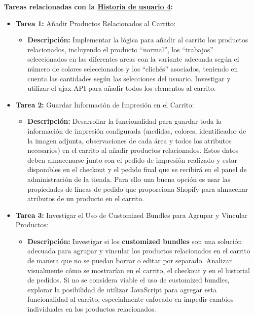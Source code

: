 \documentclass[12pt]{article}
\begin{document}
\textbf{Tareas relacionadas con la \hyperref[sec:historia4]{Historia de usuario 4}:}
\begin{itemize}
    \item \textbf{Tarea 1:} Añadir Productos Relacionados al Carrito:
          \begin{itemize}[label=--]
              \item \textbf{Descripción:} Implementar la lógica para añadir al carrito los productos relacionados, incluyendo el producto ``normal'', los ``trabajos'' seleccionados en las diferentes areas con la variante adecuada según el número de colores seleccionados y los ``clichés'' asociados, teniendo en cuenta las cantidades según las selecciones del usuario. Investigar y utilizar el ajax API para añadir todos los elementos al carrito.
          \end{itemize}
    \item \textbf{Tarea 2:} Guardar Información de Impresión en el Carrito:
          \begin{itemize}[label=--]
              \item \textbf{Descripción:} Desarrollar la funcionalidad para guardar toda la información de impresión configurada (medidas, colores, identificador de la imagen adjunta, observaciones de cada área y todos los atributos necesarios) en el carrito al añadir productos relacionados. Estos datos deben almacenarse junto con el pedido de impresión realizado y estar disponibles en el checkout y el pedido final que se recibirá en el panel de administración de la tienda. Para ello una buena opción es usar las propiedades de líneas de pedido \cite{properties-lineitem} que proporciona Shopify para almacenar atributos de un producto en el carrito.
          \end{itemize}
    \item \textbf{Tarea 3:} Investigar el Uso de Customized Bundles para Agrupar y Vincular Productos:
          \begin{itemize}[label=--]
              \item \textbf{Descripción:} Investigar si los \textbf{customized bundles} \cite{paquete-personalizado} son una solución adecuada para agrupar y vincular los productos relacionados en el carrito de manera que no se puedan borrar o editar por separado. Analizar visualmente cómo se mostrarían en el carrito, el checkout y en el historial de pedidos. Si no se considera viable el uso de customized bundles, explorar la posibilidad de utilizar JavaScript para agregar esta funcionalidad al carrito, especialmente enfocado en impedir cambios individuales en los productos relacionados.
          \end{itemize} 
\end{itemize}
\end{document}
